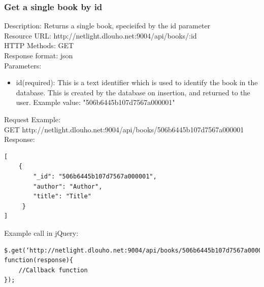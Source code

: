 \subsubsection{Get a single book by id}
Description: Returns a single book, specieifed by the id parameter		\\
\newline
Resource URL: http://netlight.dlouho.net:9004/api/books/:id	\\
HTTP Methods: GET		\\
Response format: json	\\
\newline
Parameters: 
\begin{itemize}

\item id(required): This is a text identifier which is used to identify the book in the database. This is created by the database on insertion, and returned to the user. Example value: "506b6445b107d7567a000001"

\end{itemize}
Request Example:		\\
GET		http://netlight.dlouho.net:9004/api/books/506b6445b107d7567a000001	\\
\newline
Response:
\begin{verbatim}
[
    {
        "_id": "506b6445b107d7567a000001",
        "author": "Author",
        "title": "Title"
     }
]
\end{verbatim}
Example call in jQuery:
\begin{verbatim}
$.get(‘http://netlight.dlouho.net:9004/api/books/506b6445b107d7567a000001’, function(response){
	//Callback function
});
\end{verbatim}


